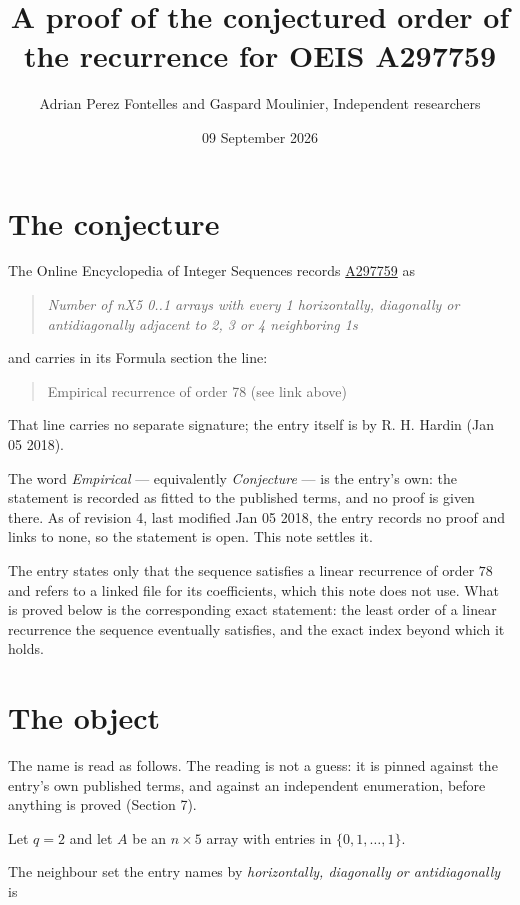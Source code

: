 \documentclass[11pt]{article}
\title{A proof of the conjectured order of the recurrence for OEIS A297759}
\author{Adrian Perez Fontelles and Gaspard Moulinier, Independent researchers}
\date{09 September 2026}
\theoremstyle{definition}
\begin{document}
\maketitle
\section{The conjecture}

The Online Encyclopedia of Integer Sequences records \href{https://oeis.org/A297759}{A297759} as

\begin{quote}\itshape Number of nX5 0..1 arrays with every 1 horizontally, diagonally or antidiagonally adjacent to 2, 3 or 4 neighboring 1s\end{quote}

and carries in its Formula section the line:

\begin{quote}\ttfamily Empirical recurrence of order 78 (see link above)\end{quote}

That line carries no separate signature; the entry itself is by R. H. Hardin (Jan 05 2018).

The word {\itshape Empirical} --- equivalently {\itshape Conjecture} --- is the entry's own: the statement is recorded as fitted to the published terms, and no proof is given there. As of revision 4, last modified Jan 05 2018, the entry records no proof and links to none, so the statement is open. This note settles it.

The entry states only that the sequence satisfies a linear recurrence of order $78$ and refers to a linked file for its coefficients, which this note does not use. What is proved below is the corresponding exact statement: the least order of a linear recurrence the sequence eventually satisfies, and the exact index beyond which it holds.

\section{The object}

The name is read as follows. The reading is not a guess: it is pinned against the entry's own published terms, and against an independent enumeration, before anything is proved (Section 7).

Let $q = 2$ and let $A$ be an $n \times 5$ array with entries in $\{0,1,\dots,1\}$.

The neighbour set the entry names by {\itshape horizontally, diagonally or antidiagonally} is
\end{document}
